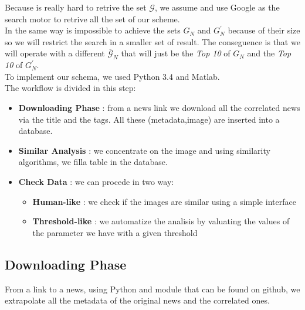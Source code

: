 \documentclass[10pt, journal,twocolumn]{IEEEtran}
\begin{document}
Because is really hard to retrive the set $\mathcal{G}$, we assume and use Google as the search motor to retrive all the set of our scheme.\\
In the same way is impossible to achieve the sets $G_N$ and $G_N^\prime$ because of their size so we will restrict the search in a smaller set of result. The conseguence is that we will operate with a different $\overline{\mathcal{G}}_N$ that will just be the \emph{Top 10} of $G_N$ and the \emph{Top 10} of $G^\prime_N$.\\[0.2cm]

To implement our schema, we used Python 3.4 and Matlab.\\
The workflow is divided in this step:
\begin{itemize}
  \item \textbf{Downloading Phase} : from a news link we download all the correlated news via the title and the tags. All these (metadata,image) are inserted into a database.
  \item \textbf{Similar Analysis} : we concentrate on the image and using similarity algorithms, we filla table in the database.
  \item \textbf{Check Data} : we can procede in two way:
  \begin{itemize}
    \item \textbf{Human-like} : we check if the images are similar using a simple interface
    \item \textbf{Threshold-like} : we automatize the analisis by valuating the values of the parameter we have with a given threshold
  \end{itemize}
\end{itemize}


\subsection{Downloading Phase}

From a link to a news, using Python and module that can be found on github, we extrapolate all the metadata of the original news and the correlated ones.\\[0,2cm]
\end{document}
